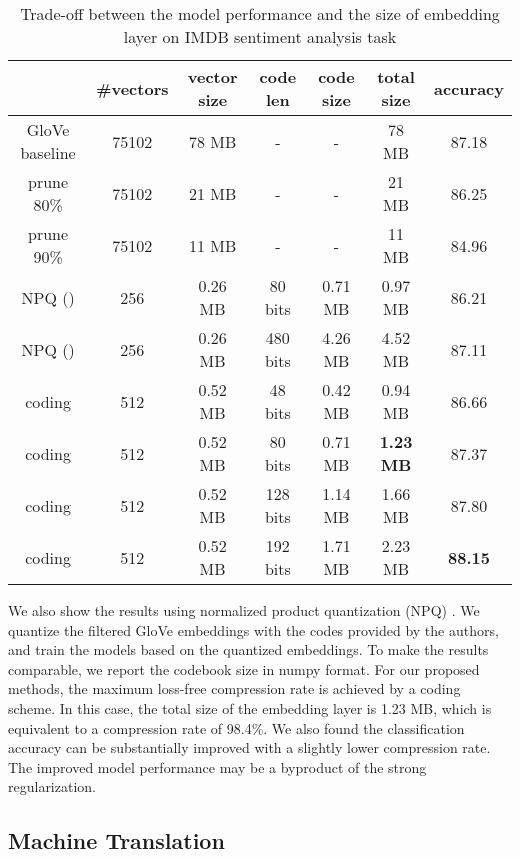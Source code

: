 \documentclass{article} \usepackage{iclr2018_conference_review,times}
\begin{document}
\begin{table}[h]
\begin{center}
    \begin{tabular}{c|c|c|c|c|c|c}
    \hline \hline
    & {\bf \#vectors}  & {\bf \small vector size} & {\bf code len} & {\bf code size} & {\bf total size} & {\bf accuracy} \\
    \hline
    \small{GloVe baseline} & 75102 & 78 MB & - & - & 78 MB & 87.18 \\
    \hline
    \small{prune 80\%} & 75102 & 21 MB & - & - & 21 MB & 86.25 \\
    \small{prune 90\%} & 75102 & 11 MB & - & - & 11 MB & 84.96 \\
\hline
    NPQ () & 256 & 0.26 MB & 80 bits & 0.71 MB & 0.97 MB & 86.21 \\
    NPQ () & 256 & 0.26 MB & 480 bits & 4.26 MB & 4.52 MB & 87.11 \\
\hline
     coding & 512 & 0.52 MB & 48 bits & 0.42 MB & {0.94 MB} & {86.66} \\
     coding & 512 & 0.52 MB & 80 bits & 0.71 MB & {\bf 1.23 MB} & {87.37} \\
     coding & 512 & 0.52 MB & 128 bits & 1.14 MB & {1.66 MB} & {87.80} \\
     coding & 512 & 0.52 MB & 192 bits & 1.71 MB & {2.23 MB} & {\bf 88.15} \\
    \hline \hline
    \end{tabular}
    \caption{Trade-off between the model performance and the size of embedding layer on IMDB sentiment analysis task}
    \label{table:imdb_acc}
\end{center}
\end{table}

We also show the results using normalized product quantization (NPQ) \citep{Joulin2016FastTextzipCT}. We quantize the filtered GloVe embeddings with the codes provided by the authors, and train the models based on the quantized embeddings. To make the results comparable, we report the codebook size in numpy format. For our proposed methods, the maximum loss-free compression rate is achieved by a  coding scheme. In this case, the total size of the embedding layer is 1.23 MB, which is equivalent to a compression rate of 98.4\%. We also found the classification accuracy can be substantially improved with a slightly lower compression rate. The improved model performance may be a byproduct of the strong regularization.

\subsection{Machine Translation}
\end{document}
